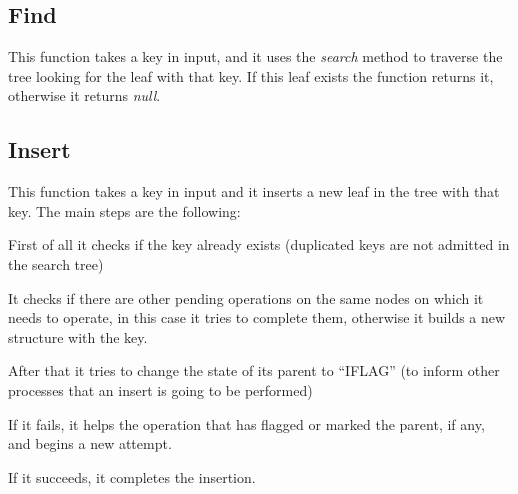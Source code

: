 \documentclass[a4paper]{article}
\begin{document}
\subsection{Find}
This function takes a key in input, and it uses the \emph{search} method to traverse the tree looking for the leaf with that key. If this leaf exists the function returns it, otherwise it returns \emph{null}.

\subsection{Insert}
This function takes a key in input and it inserts a new leaf in the tree with that key. The main steps are the following:
\begin{compactitem}
  \item First of all it checks if the key already exists (duplicated keys are not admitted in the search tree)
  \item It checks if there are other pending operations on the same nodes on which it needs to operate, in this case it tries to complete them, otherwise it builds a new structure with the key. 
  \item After that it tries to change the state of its parent to ``IFLAG'' (to inform other processes that an insert is going to be performed)
  \begin{compactitem}
    \item If it fails, it helps the operation that has flagged or marked the parent, if any, and begins a new attempt.
    \item If it succeeds, it completes the insertion.
  \end{compactitem}
\end{compactitem}
\end{document}
